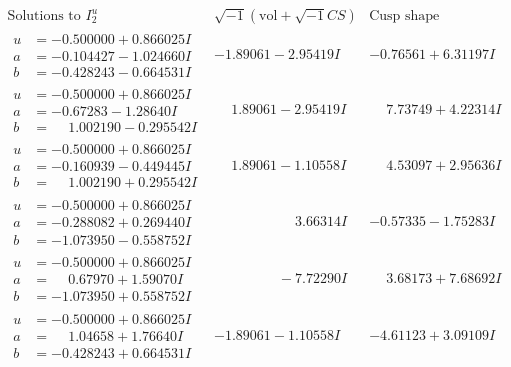 \documentclass[1p]{elsarticle_modified}
\theoremstyle{definition}
\newcommand{\I}{\sqrt{-1}}
\begin{document}
$$\begin{array}{c|c|c}  
\text{Solutions to }I^u_{2}& \I (\text{vol} + \sqrt{-1}CS) & \text{Cusp shape}\\
 \hline 
\begin{aligned}
u &= -0.500000 + 0.866025 I \\
a &= -0.104427 - 1.024660 I \\
b &= -0.428243 - 0.664531 I\end{aligned}
 & -1.89061 - 2.95419 I & -0.76561 + 6.31197 I \\ \hline\begin{aligned}
u &= -0.500000 + 0.866025 I \\
a &= -0.67283 - 1.28640 I \\
b &= \phantom{-}1.002190 - 0.295542 I\end{aligned}
 & \phantom{-}1.89061 - 2.95419 I & \phantom{-}7.73749 + 4.22314 I \\ \hline\begin{aligned}
u &= -0.500000 + 0.866025 I \\
a &= -0.160939 - 0.449445 I \\
b &= \phantom{-}1.002190 + 0.295542 I\end{aligned}
 & \phantom{-}1.89061 - 1.10558 I & \phantom{-}4.53097 + 2.95636 I \\ \hline\begin{aligned}
u &= -0.500000 + 0.866025 I \\
a &= -0.288082 + 0.269440 I \\
b &= -1.073950 - 0.558752 I\end{aligned}
 & \phantom{-0.000000 -}3.66314 I & -0.57335 - 1.75283 I \\ \hline\begin{aligned}
u &= -0.500000 + 0.866025 I \\
a &= \phantom{-}0.67970 + 1.59070 I \\
b &= -1.073950 + 0.558752 I\end{aligned}
 & \phantom{-0.000000 } -7.72290 I & \phantom{-}3.68173 + 7.68692 I \\ \hline\begin{aligned}
u &= -0.500000 + 0.866025 I \\
a &= \phantom{-}1.04658 + 1.76640 I \\
b &= -0.428243 + 0.664531 I\end{aligned}
 & -1.89061 - 1.10558 I & -4.61123 + 3.09109 I \\ \hline\begin{aligned}

\end{aligned}
\end{array}$$
\end{document}
